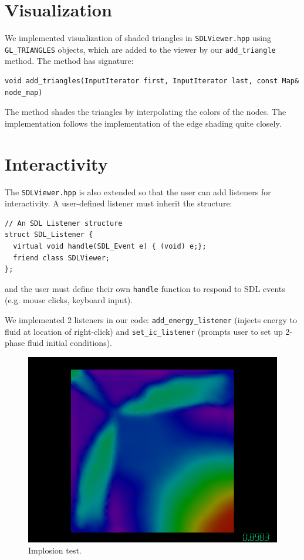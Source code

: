 \documentclass[12pt]{article}
\begin{document}
\section{Visualization}\label{sec:viz}

We implemented visualization of shaded triangles in {\tt SDLViewer.hpp} using {\tt GL\_TRIANGLES} objects, which are added to the viewer by our {\tt add\_triangle} method. The method has signature:
\begin{lstlisting}
void add_triangles(InputIterator first, InputIterator last, const Map& node_map)
\end{lstlisting}
The method shades the triangles by interpolating the colors of the nodes. The implementation follows the implementation of the edge shading quite closely.

\section{Interactivity}\label{sec:interactivity}

The {\tt SDLViewer.hpp} is also extended so that the user can add listeners for interactivity. A user-defined listener must inherit the structure:
\begin{lstlisting}
// An SDL Listener structure
struct SDL_Listener {
  virtual void handle(SDL_Event e) { (void) e;};
  friend class SDLViewer;
};
\end{lstlisting}
and the user must define their own {\tt handle} function to respond to SDL events (e.g. mouse clicks, keyboard input).

We implemented 2 listeners in our code: {\tt add\_energy\_listener} (injects energy to fluid at location of right-click) and {\tt set\_ic\_listener} (prompts user to set up 2-phase fluid initial conditions).


\begin{figure}[H!]
\centering
\includegraphics[width=0.8\linewidth]{Implosion}
\caption{Implosion test.}
\label{fig:implosion}
\end{figure}
\end{document}
